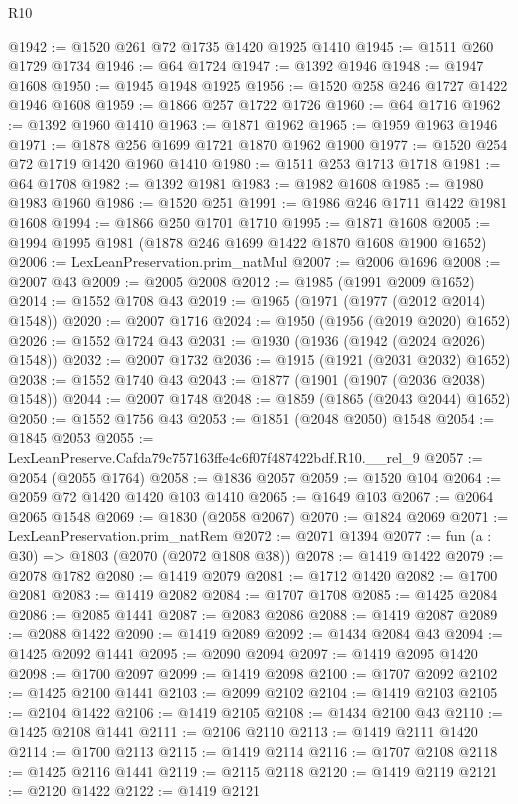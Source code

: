 \begin{lexlean}{R10}
\begin{coremodule}
@1942 := @1520 @261 @72 @1735 @1420 @1925 @1410
@1945 := @1511 @260 @1729 @1734
@1946 := @64 @1724
@1947 := @1392 @1946
@1948 := @1947 @1608
@1950 := @1945 @1948 @1925
@1956 := @1520 @258 @246 @1727 @1422 @1946 @1608
@1959 := @1866 @257 @1722 @1726
@1960 := @64 @1716
@1962 := @1392 @1960 @1410
@1963 := @1871 @1962
@1965 := @1959 @1963 @1946
@1971 := @1878 @256 @1699 @1721 @1870 @1962 @1900
@1977 := @1520 @254 @72 @1719 @1420 @1960 @1410
@1980 := @1511 @253 @1713 @1718
@1981 := @64 @1708
@1982 := @1392 @1981
@1983 := @1982 @1608
@1985 := @1980 @1983 @1960
@1986 := @1520 @251
@1991 := @1986 @246 @1711 @1422 @1981 @1608
@1994 := @1866 @250 @1701 @1710
@1995 := @1871 @1608
@2005 := @1994 @1995 @1981 (@1878 @246 @1699 @1422 @1870 @1608 @1900 @1652)
@2006 := LexLeanPreservation.prim_natMul
@2007 := @2006 @1696
@2008 := @2007 @43
@2009 := @2005 @2008
@2012 := @1985 (@1991 @2009 @1652)
@2014 := @1552 @1708 @43
@2019 := @1965 (@1971 (@1977 (@2012 @2014) @1548))
@2020 := @2007 @1716
@2024 := @1950 (@1956 (@2019 @2020) @1652)
@2026 := @1552 @1724 @43
@2031 := @1930 (@1936 (@1942 (@2024 @2026) @1548))
@2032 := @2007 @1732
@2036 := @1915 (@1921 (@2031 @2032) @1652)
@2038 := @1552 @1740 @43
@2043 := @1877 (@1901 (@1907 (@2036 @2038) @1548))
@2044 := @2007 @1748
@2048 := @1859 (@1865 (@2043 @2044) @1652)
@2050 := @1552 @1756 @43
@2053 := @1851 (@2048 @2050) @1548
@2054 := @1845 @2053
@2055 := LexLeanPreserve.Cafda79c757163ffe4c6f07f487422bdf.R10.__rel_9
@2057 := @2054 (@2055 @1764)
@2058 := @1836 @2057
@2059 := @1520 @104
@2064 := @2059 @72 @1420 @1420 @103 @1410
@2065 := @1649 @103
@2067 := @2064 @2065 @1548
@2069 := @1830 (@2058 @2067)
@2070 := @1824 @2069
@2071 := LexLeanPreservation.prim_natRem
@2072 := @2071 @1394
@2077 := fun (a : @30) => @1803 (@2070 (@2072 @1808 @38))
@2078 := @1419 @1422
@2079 := @2078 @1782
@2080 := @1419 @2079
@2081 := @1712 @1420
@2082 := @1700 @2081
@2083 := @1419 @2082
@2084 := @1707 @1708
@2085 := @1425 @2084
@2086 := @2085 @1441
@2087 := @2083 @2086
@2088 := @1419 @2087
@2089 := @2088 @1422
@2090 := @1419 @2089
@2092 := @1434 @2084 @43
@2094 := @1425 @2092 @1441
@2095 := @2090 @2094
@2097 := @1419 @2095 @1420
@2098 := @1700 @2097
@2099 := @1419 @2098
@2100 := @1707 @2092
@2102 := @1425 @2100 @1441
@2103 := @2099 @2102
@2104 := @1419 @2103
@2105 := @2104 @1422
@2106 := @1419 @2105
@2108 := @1434 @2100 @43
@2110 := @1425 @2108 @1441
@2111 := @2106 @2110
@2113 := @1419 @2111 @1420
@2114 := @1700 @2113
@2115 := @1419 @2114
@2116 := @1707 @2108
@2118 := @1425 @2116 @1441
@2119 := @2115 @2118
@2120 := @1419 @2119
@2121 := @2120 @1422
@2122 := @1419 @2121

\end{coremodule}
\end{lexlean}
